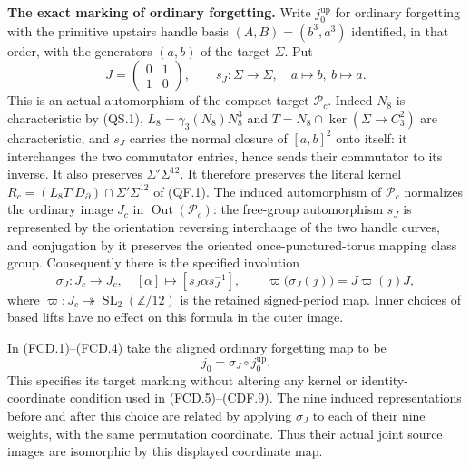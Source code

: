 \par\medskip\noindent\textbf{The exact marking of ordinary forgetting.}\quad
Write $j_0^{\mathrm{up}}$ for ordinary forgetting with the primitive
upstairs handle basis $(A,B)=(b^3,a^3)$ identified, in that order, with
the generators $(a,b)$ of the target $\Sigma$.  Put
\[
 J=\begin{pmatrix}0&1\\1&0\end{pmatrix},\qquad
 s_J:\Sigma\longrightarrow\Sigma,\quad a\longmapsto b,\ b\longmapsto a.
                                                               \tag{MFP.1}
\]
This is an actual automorphism of the compact target
$\mathcal P_c$.  Indeed $N_8$ is characteristic by (QS.1),
$L_8=\gamma_3(N_8)N_8^3$ and
$T=N_8\cap\ker(\Sigma\to C_3^2)$ are characteristic, and $s_J$
carries the normal closure of $[a,b]^2$ onto itself: it interchanges
the two commutator entries, hence sends their commutator to its inverse.
It also preserves $\Sigma'\Sigma^{12}$.  It therefore preserves the
literal kernel $R_c=(L_8T'D_\partial)\cap\Sigma'\Sigma^{12}$
of (QF.1).  The induced automorphism of $\mathcal P_c$ normalizes
the ordinary image $J_c$ in $\operatorname{Out}(\mathcal P_c)$:
the free-group automorphism $s_J$ is represented by the orientation
reversing interchange of the two handle curves, and conjugation by it
preserves the oriented once-punctured-torus mapping class group.
Consequently there is the specified involution
\[
 \sigma_J:J_c\longrightarrow J_c,\quad
 [\alpha]\longmapsto[s_J\alpha s_J^{-1}],\qquad
 \varpi\bigl(\sigma_J(j)\bigr)=J\varpi(j)J,
                                                               \tag{MFP.2}
\]
where $\varpi:J_c\twoheadrightarrow\operatorname{SL}_2(\mathbb Z/12)$
is the retained signed-period map.  Inner choices of based lifts have
no effect on this formula in the outer image.

In (FCD.1)--(FCD.4) take the aligned ordinary forgetting map to be
\[
                  j_0=\sigma_J\circ j_0^{\mathrm{up}}.
                                                               \tag{MFP.3}
\]
This specifies its target marking without altering any kernel or
identity-coordinate condition used in (FCD.5)--(CDF.9).  The nine induced
representations before and after this choice are related by applying
$\sigma_J$ to each of their nine weights, with the same permutation
coordinate.  Thus their actual joint source images are isomorphic by
this displayed coordinate map.

